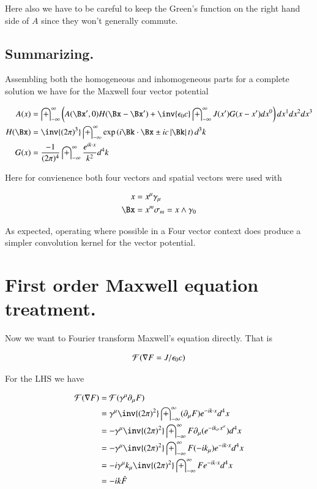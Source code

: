 \documentclass{article}
\newcommand{\FF}[0]{\mathcal{F}}
\newcommand{\IIinf}[0]{ \int_{-\infty}^\infty }
\begin{document}
Here also we have to be careful to keep the Green's function on the right hand side of $A$ since they 
won't generally commute.

\subsection{ Summarizing. }

Assembling both the homogeneous and inhomogeneous parts for a complete solution we have for the Maxwell
four vector potential

\begin{align}
A(x) &= \IIinf \left( A(\Bx', 0) H( \Bx - \Bx' ) + \inv{\epsilon_0 c} \IIinf {J}(x') G(x-x') dx^0 \right) dx^1 dx^2 dx^3 \\
H(\Bx) &= \inv{({2\pi})^3} \IIinf \exp\left( i \Bk \cdot \Bx  \pm i c \Abs{\Bk} t \right) d^3 k \\
G(x) &= \frac{-1}{ ({2\pi})^4} \IIinf \frac{e^{ i k \cdot x }}{ k^2 } d^4 k
\end{align}

Here for convienence both four vectors and spatial vectors were used with

\begin{align*}
x &= x^\mu \gamma_\mu \\
\Bx &= x^m \sigma_m = x \wedge \gamma_0
\end{align*}

As expected, operating where possible in a Four vector context does produce a simpler convolution kernel for the vector potential.

\section{ First order Maxwell equation treatment. }

Now we want to Fourier transform Maxwell's equation directly.  That is

\begin{align*}
\FF(\grad F = J/\epsilon_0 c)
\end{align*}

For the LHS we have

\begin{align*}
\FF(\grad F)
&= \FF(\gamma^\mu \partial_\mu F) \\
&= \gamma^\mu \inv{(2\pi)^2} \IIinf (\partial_\mu F) e^{ - i k \cdot x } d^4 x \\
&= -\gamma^\mu \inv{(2\pi)^2} \IIinf F \partial_\mu (e^{ - i k_\sigma x^\sigma }) d^4 x \\
&= -\gamma^\mu \inv{(2\pi)^2} \IIinf F (-i k_\mu ) e^{ - i k \cdot x } d^4 x \\
&= -i \gamma^\mu k_\mu \inv{(2\pi)^2} \IIinf F e^{ - i k \cdot x } d^4 x \\
&= -i k \hat{F}
\end{align*}
\end{document}
